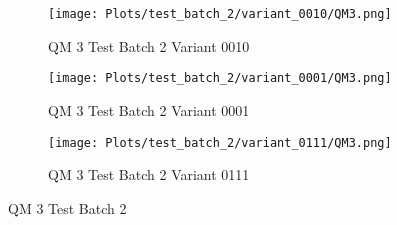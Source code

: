 \documentclass{DissertateFigs}
\begin{document}
\begin{figure}[t!]
\medskip

    \begin{subfigure}{0.47\textwidth}
    \texttt{[image: Plots/test\_batch\_2/variant\_0010/QM3.png]}
    \caption{QM 3 Test Batch 2 Variant 0010}
    \end{subfigure}
    \begin{subfigure}{0.47\textwidth}
    \texttt{[image: Plots/test\_batch\_2/variant\_0001/QM3.png]}
    \caption{QM 3 Test Batch 2 Variant 0001}
    \end{subfigure}

\medskip

    \begin{subfigure}{0.47\textwidth}
    \texttt{[image: Plots/test\_batch\_2/variant\_0111/QM3.png]}
    \caption{QM 3 Test Batch 2 Variant 0111}
    \end{subfigure}
\caption{QM 3 Test Batch 2}
    \end{figure}
\clearpage
\end{document}
